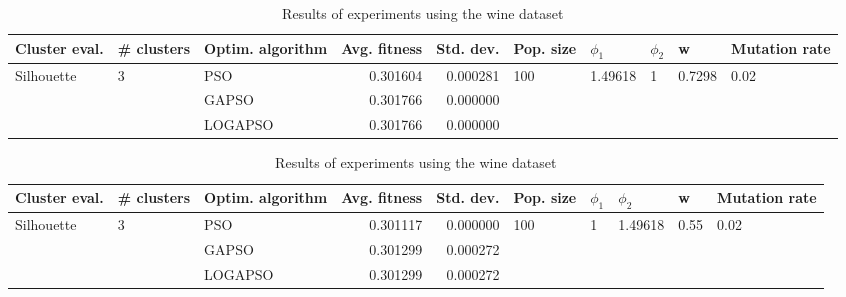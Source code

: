 \documentclass{article}
\begin{document}
\begin{table}
\centering
\caption{Results of experiments using the wine dataset}
\begin{tabular}{lllrrlllll}
\toprule
              Cluster eval. &        \# clusters & Optim. algorithm &  Avg. fitness &  Std. dev. &            Pop. size &               $\phi_{1}$ &         $\phi_{2}$ &                       w &         Mutation rate \\
\midrule
\multirow{3}{*}{Silhouette} & \multirow{3}{*}{3} &              PSO &      0.301604 &   0.000281 & \multirow{3}{*}{100} & \multirow{3}{*}{1.49618} & \multirow{3}{*}{1} & \multirow{3}{*}{0.7298} & \multirow{3}{*}{0.02} \\
                            &                    &            GAPSO &      0.301766 &   0.000000 &                      &                          &                    &                         &                       \\
                            &                    &          LOGAPSO &      0.301766 &   0.000000 &                      &                          &                    &                         &                       \\
\bottomrule
\end{tabular}
\end{table}
\begin{table}
\centering
\caption{Results of experiments using the wine dataset}
\begin{tabular}{lllrrlllll}
\toprule
              Cluster eval. &        \# clusters & Optim. algorithm &  Avg. fitness &  Std. dev. &            Pop. size &         $\phi_{1}$ &               $\phi_{2}$ &                     w &         Mutation rate \\
\midrule
\multirow{3}{*}{Silhouette} & \multirow{3}{*}{3} &              PSO &      0.301117 &   0.000000 & \multirow{3}{*}{100} & \multirow{3}{*}{1} & \multirow{3}{*}{1.49618} & \multirow{3}{*}{0.55} & \multirow{3}{*}{0.02} \\
                            &                    &            GAPSO &      0.301299 &   0.000272 &                      &                    &                          &                       &                       \\
                            &                    &          LOGAPSO &      0.301299 &   0.000272 &                      &                    &                          &                       &                       \\
\bottomrule
\end{tabular}
\end{table}
\end{document}
